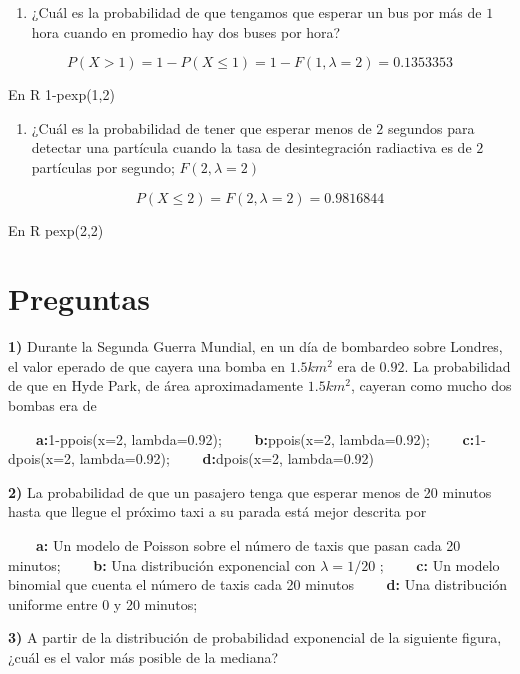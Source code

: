\documentclass[
]{book}
\providecommand{\tightlist}{%
  \setlength{\itemsep}{0pt}\setlength{\parskip}{0pt}}
\begin{document}
\begin{enumerate}
\def\labelenumi{\arabic{enumi})}
\tightlist
\item
  ¿Cuál es la probabilidad de que tengamos que esperar un bus por más de \(1\) hora cuando en promedio hay dos buses por hora?
\end{enumerate}

\[P(X > 1)=1-P(X \le 1) = 1-F(1,\lambda=2)=0.1353353\]

En R 1-pexp(1,2)

\begin{enumerate}
\def\labelenumi{\arabic{enumi})}
\setcounter{enumi}{1}
\tightlist
\item
  ¿Cuál es la probabilidad de tener que esperar menos de \(2\) segundos para detectar una partícula cuando la tasa de desintegración radiactiva es de \(2\) partículas por segundo; \(F(2,\lambda=2)\)
\end{enumerate}

\[P(X\le 2)=F(2,\lambda=2)=0.9816844\]

En R pexp(2,2)

\hypertarget{preguntas-5}{%
\section{Preguntas}\label{preguntas-5}}

\textbf{1)} Durante la Segunda Guerra Mundial, en un día de bombardeo sobre Londres, el valor eperado de que cayera una bomba en \(1.5km^2\) era de \(0.92\). La probabilidad de que en Hyde Park, de área aproximadamente \(1.5km^2\), cayeran como mucho dos bombas era de

\textbf{\(\qquad\)a:}1-ppois(x=2, lambda=0.92);
\textbf{\(\qquad\)b:}ppois(x=2, lambda=0.92); \textbf{\(\qquad\)c:}1-dpois(x=2, lambda=0.92); \textbf{\(\qquad\)d:}dpois(x=2, lambda=0.92)

\textbf{2)} La probabilidad de que un pasajero tenga que esperar menos de 20 minutos hasta que llegue el próximo taxi a su parada está mejor descrita por

\textbf{\(\qquad\)a:} Un modelo de Poisson sobre el número de taxis que pasan cada 20 minutos;
\textbf{\(\qquad\)b:} Una distribución exponencial con \(\lambda=1/20\) ;
\textbf{\(\qquad\)c:} Un modelo binomial que cuenta el número de taxis cada 20 minutos
\textbf{\(\qquad\)d:} Una distribución uniforme entre 0 y 20 minutos;

\textbf{3)} A partir de la distribución de probabilidad exponencial de la siguiente figura, ¿cuál es el valor más posible de la mediana?
\end{document}
